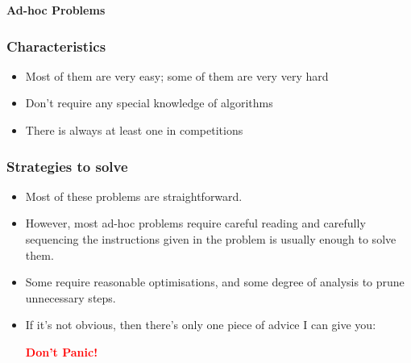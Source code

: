 \documentclass{beamer}
\begin{document}
\begin{frame}   
    \vspace*{\fill}
    \begingroup
    \centering
    \begin{center}
        \huge \textbf{Ad-hoc Problems}
    \end{center}
\endgroup
\vspace*{\fill}
\end{frame}

\begin{frame}
    \frametitle{Characteristics}
    \begin{itemize}
            \pause
        \item Most of them are very easy; some of them are very very hard
            \pause
        \item Don't require any special knowledge of algorithms
            \pause
        \item There is always at least one in competitions
    \end{itemize}
\end{frame}

\begin{frame}
    \frametitle{Strategies to solve}
    \begin{itemize}
            \pause
        \item Most of these problems are straightforward.
            \pause
        \item However, most ad-hoc problems require careful reading and carefully sequencing the instructions given in the problem is usually enough to solve them.
            \pause
        \item Some require reasonable optimisations, and some degree of analysis to prune unnecessary steps.
            \pause
        \item If it's not obvious, then there's only one piece of advice I can give you:

            \vspace*{\fill}
            \begingroup
            \centering
            \begin{center}
                \large \textbf{\textcolor{red}{Don't Panic!}}
            \end{center}
        \endgroup
        \vspace*{\fill}
\end{itemize}
\end{frame}
\end{document}
